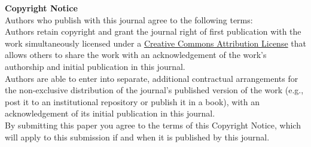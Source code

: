 \documentclass{jors}
\begin{document}




{ \bf Copyright Notice} \\
Authors who publish with this journal agree to the following terms: \\

Authors retain copyright and grant the journal right of first publication with the work simultaneously licensed under a  \href{http://creativecommons.org/licenses/by/3.0/}{Creative Commons Attribution License} that allows others to share the work with an acknowledgement of the work's authorship and initial publication in this journal. \\

Authors are able to enter into separate, additional contractual arrangements for the non-exclusive distribution of the journal's published version of the work (e.g., post it to an institutional repository or publish it in a book), with an acknowledgement of its initial publication in this journal. \\

By submitting this paper you agree to the terms of this Copyright Notice, which will apply to this submission if and when it is published by this journal.
\end{document}
